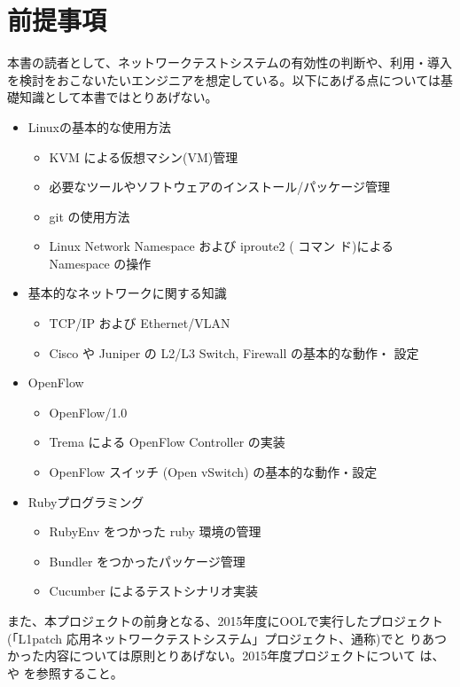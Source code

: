  \section{前提事項}
 \label{sec:premise}

本書の読者として、ネットワークテストシステムの有効性の判断や、利用・導入
を検討をおこないたいエンジニアを想定している。以下にあげる点については基
礎知識として本書ではとりあげない。

\begin{itemize}
 \item Linuxの基本的な使用方法
       \begin{itemize}
        \item KVM による仮想マシン(VM)管理
        \item 必要なツールやソフトウェアのインストール/パッケージ管理
        \item git の使用方法
        \item Linux Network Namespace および iproute2 (  コマン
              ド)によるNamespace の操作
       \end{itemize}
 \item 基本的なネットワークに関する知識
       \begin{itemize}
        \item TCP/IP および Ethernet/VLAN
        \item Cisco や Juniper の L2/L3 Switch, Firewall の基本的な動作・
              設定
       \end{itemize}
 \item OpenFlow
       \begin{itemize}
        \item OpenFlow/1.0
        \item Trema による OpenFlow Controller の実装
        \item OpenFlow スイッチ (Open vSwitch) の基本的な動作・設定
       \end{itemize}
 \item Rubyプログラミング
       \begin{itemize}
        \item RubyEnv をつかった ruby 環境の管理
        \item Bundler をつかったパッケージ管理
        \item Cucumber によるテストシナリオ実装
       \end{itemize}
\end{itemize}

また、本プロジェクトの前身となる、2015年度にOOLで実行したプロジェクト
(「L1patch 応用ネットワークテストシステム」プロジェクト、通称\lopj)でと
りあつかった内容については原則とりあげない。2015年度プロジェクトについて
は、\lopjpoc や \lopjtech を参照すること。

